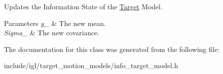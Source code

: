 Updates the Information State of the \hyperlink{structnx_1_1Target}{Target} Model. 
\begin{DoxyParams}{Parameters}
{\em y\+\_\+} & The new mean. \\
\hline
{\em Sigma\+\_\+} & The new covariance. \\
\hline
\end{DoxyParams}


The documentation for this class was generated from the following file\+:\begin{DoxyCompactItemize}
\item 
include/igl/target\+\_\+motion\+\_\+models/info\+\_\+target\+\_\+model.\+h\end{DoxyCompactItemize}
